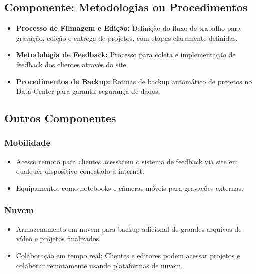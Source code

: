 \subsection{Componente: Metodologias ou Procedimentos}
\begin{itemize}
  \item \textbf{Processo de Filmagem e Edição:} Definição do fluxo de trabalho para gravação, edição e entrega de projetos, com etapas claramente definidas.
  \item \textbf{Metodologia de Feedback:} Processo para coleta e implementação de feedback dos clientes através do site.
  \item \textbf{Procedimentos de Backup:} Rotinas de backup automático de projetos no Data Center para garantir segurança de dados.
\end{itemize}

\subsection{Outros Componentes}

\subsubsection{Mobilidade}
\begin{itemize}
    \item Acesso remoto para clientes acessarem o sistema de feedback via site em qualquer dispositivo conectado à internet.
    \item Equipamentos como notebooks e câmeras móveis para gravações externas.
\end{itemize}

\subsubsection{Nuvem}
\begin{itemize}
    \item Armazenamento em nuvem para backup adicional de grandes arquivos de vídeo e projetos finalizados.
    \item Colaboração em tempo real: Clientes e editores podem acessar projetos e colaborar remotamente usando plataformas de nuvem.
\end{itemize}
